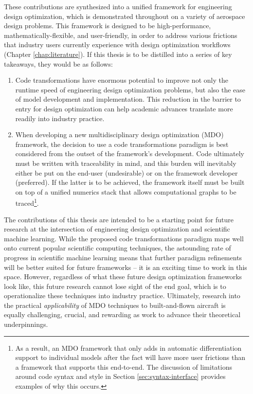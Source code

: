 These contributions are synthesized into a unified framework for engineering design optimization, which is demonstrated throughout on a variety of aerospace design problems. This framework is designed to be high-performance, mathematically-flexible, and user-friendly, in order to address various frictions that industry users currently experience with design optimization workflows (Chapter \ref{chap:literature}). If this thesis is to be distilled into a series of key takeaways, they would be as follows:
\begin{enumerate}
    \item Code transformations have enormous potential to improve not only the runtime speed of engineering design optimization problems, but also the ease of model development and implementation. This reduction in the barrier to entry for design optimization can help academic advances translate more readily into industry practice.
    \item When developing a new multidisciplinary design optimization (MDO) framework, the decision to use a code transformations paradigm is best considered from the outset of the framework's development. Code ultimately must be written with traceability in mind, and this burden will inevitably either be put on the end-user (undesirable) or on the framework developer (preferred). If the latter is to be achieved, the framework itself must be built on top of a unified numerics stack that allows computational graphs to be traced\footnote{As a result, an MDO framework that only adds in automatic differentiation support to individual models after the fact will have more user frictions than a framework that supports this end-to-end. The discussion of limitations around code syntax and style in Section \ref{sec:syntax-interface} provides examples of why this occurs.}.
\end{enumerate}

\noindent The contributions of this thesis are intended to be a starting point for future research at the intersection of engineering design optimization and scientific machine learning. While the proposed code transformations paradigm maps well onto current popular scientific computing techniques, the astounding rate of progress in scientific machine learning means that further paradigm refinements will be better suited for future frameworks -- it is an exciting time to work in this space. However, regardless of what these future design optimization frameworks look like, this future research cannot lose sight of the end goal, which is to operationalize these techniques into industry practice. Ultimately, research into the practical \emph{applicability} of MDO techniques to built-and-flown aircraft is equally challenging, crucial, and rewarding as work to advance their theoretical underpinnings.
